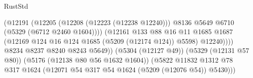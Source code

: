 \begin{lexlean}{RustStd}
\begin{coremodule}
                                                      (@12191
                                                        (@12205
                                                          (@12208 (@12223 (@12238 @12240)))
                                                          @8136
                                                          @5649
                                                          @6710
                                                          (@5329 (@6712 @2460 @1604))))
                                                      (@12161
                                                        @133
                                                        @88
                                                        @16
                                                        @11
                                                        @1685
                                                        @1687
                                                        (@12169
                                                          @124
                                                          @16
                                                          @124
                                                          @1685
                                                          (@5209 (@12174 @124))
                                                          @5598)
                                                        @12240))))
                                                @8234
                                                @8237
                                                @8240
                                                @8243
                                                @5649))
                                            (@5304 (@12127 @49))
                                            (@5329 (@12131 @57 @80))
                                            (@5176 (@12138 @80 @56 @1632 @1604))
                                            (@5822
                                              @11832
                                              @1312
                                              @78
                                              @317
                                              @1624
                                              (@12071
                                                @54
                                                @317
                                                @54
                                                @1624
                                                (@5209 (@12076 @54))
                                                @5430)))

\end{coremodule}
\end{lexlean}
